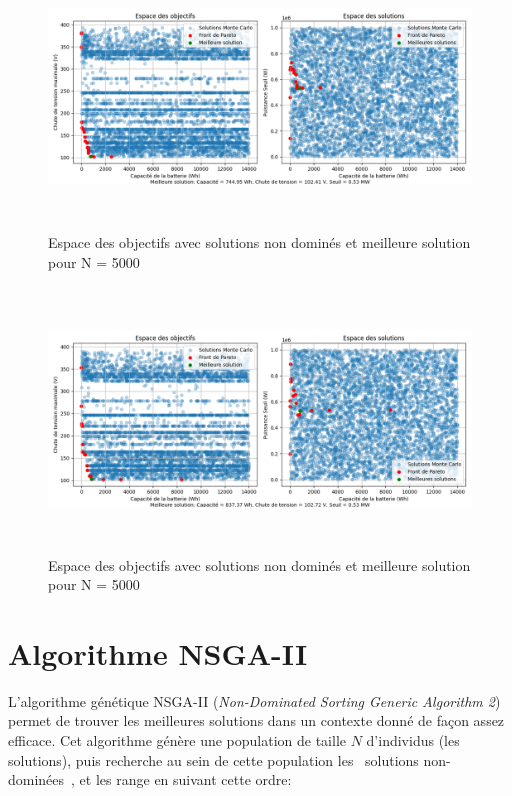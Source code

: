 \documentclass[11pt, a4paper, oneside, portrait]{report}
\begin{document}
            \begin{figure}[H]
                \centering
                \includegraphics[height=7cm]{Monte-Carlo_5000(1).png}
                \caption{Espace des objectifs avec solutions non dominés et meilleure solution pour N = 5000}
            \end{figure}

            \begin{figure}[H]
                \centering
                \includegraphics[height=7cm]{Monte-Carlo_5000(2).png}
                \caption{Espace des objectifs avec solutions non dominés et meilleure solution pour N = 5000}
            \end{figure}
            


    \section*{Algorithme NSGA-II}
        L'algorithme génétique NSGA-II (\emph{Non-Dominated Sorting Generic Algorithm 2}) permet de trouver les meilleures solutions dans un contexte donné de façon assez efficace.
        Cet algorithme génère une population de taille $N$ d'individus (les solutions), puis recherche au sein de cette population les \guillemotleft{}~solutions non-dominées~\guillemotright{}, et les range en suivant cette ordre:
\end{document}
